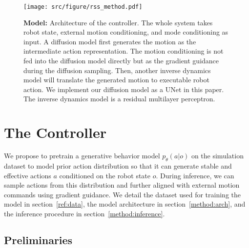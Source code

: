 \begin{figure*}[t]
    \centering
    \texttt{[image: src/figure/rss\_method.pdf]}
    \caption{\textbf{Model:} Architecture of the \mname{} controller. The whole system takes robot state, external motion conditioning, and mode conditioning as input. A diffusion model first generates the motion as the intermediate action representation. The motion conditioning is not fed into the diffusion model directly but as the gradient guidance during the diffusion sampling. Then, another inverse dynamics model will translate the generated motion to executable robot action. We implement our diffusion model as a UNet in this paper. The inverse dynamics model is a residual multilayer perceptron.  }
    \label{fig:arch}
\end{figure*}
\section{The \mname{} Controller}

We propose to pretrain a generative behavior model $p_{\theta}(a|o)$ on the simulation dataset to model prior action distribution so that it can generate stable and effective actions $a$ conditioned on the robot state $o$. During inference, we can sample actions from this distribution and further aligned with external motion commands using gradient guidance. We detail the dataset used for training the model in section~\ref{ref:data}, the model architecture in section~\ref{method:arch}, and the inference procedure in section~\ref{method:inference}.

\subsection{Preliminaries}
\label{method:prelim}
